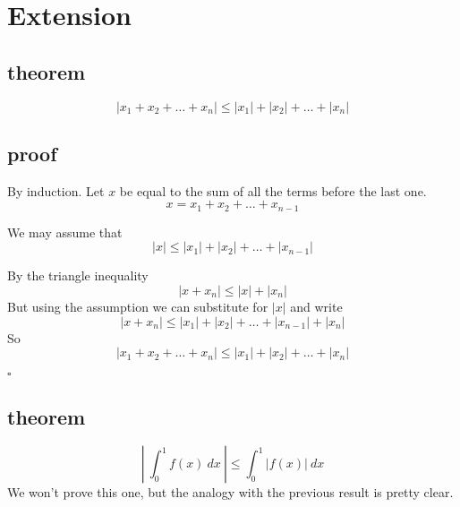 \documentclass[11pt, oneside]{article}
\begin{document}
\section{Extension}

\subsection*{theorem}

\[ |x_1 + x_2 + \dots + x_n| \le |x_1| + |x_2| + \dots + |x_n| \]

\subsection*{proof}

By induction.  Let $x$ be equal to the sum of all the terms before the last one.
\[ x = x_1 + x_2 + \dots + x_{n-1} \]

We may assume that
\[ |x| \le  |x_1| + |x_2| + \dots + |x_{n-1}| \] 

By the triangle inequality
\[ |x + x_n| \le |x| + |x_n| \]
But using the assumption we can substitute for $|x|$ and write
\[ |x + x_n| \le |x_1| + |x_2| + \dots + |x_{n-1}| + |x_n| \]
So
\[ |x_1 + x_2 + \dots + x_n| \le |x_1| + |x_2| + \dots + |x_n| \]

$\square$

\subsection*{theorem}
\[ | \ \int_0^1 f(x) \ dx \ | \le \int_0^1 |f(x)| \ dx \]
We won't prove this one, but the analogy with the previous result is pretty clear.
\end{document}
